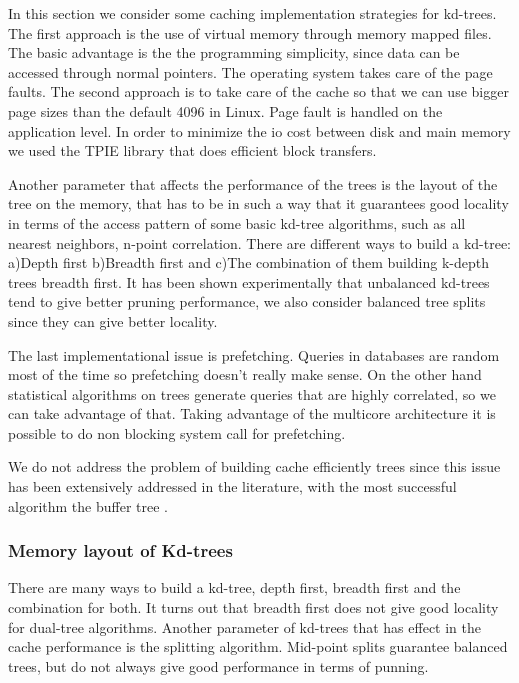 \documentclass[12pt,letterpaper,doublespaced,ETD,dvips,proposal]{gtthesis}
\begin{document}
\begin{Body}
In this section we consider some caching implementation strategies for
kd-trees. The first approach is the use of virtual memory through
memory mapped files. The basic advantage is the the programming
simplicity, since data can be accessed through normal pointers. The
operating system takes care of the page faults. The second approach
is to take care of the cache so that we can use bigger page sizes
than the default 4096 in Linux. Page fault is handled on the
application level. In order to minimize the io cost between disk and
main memory we used the TPIE library that does efficient block
transfers.

Another parameter that affects the performance of the trees is the
layout of the tree on the memory, that has to be in such a way that
it guarantees good locality in terms of the access pattern of some
basic kd-tree algorithms, such as all  nearest neighbors, n-point
correlation. There are different ways to build a kd-tree: a)Depth
first b)Breadth first and c)The combination of them building k-depth
trees breadth first. It has been shown experimentally that
unbalanced kd-trees tend to give better pruning performance, we also
consider balanced tree splits since they can give better locality.

The last implementational issue is prefetching.  Queries in
databases are random most of the time so prefetching doesn't really
make sense. On the other hand statistical algorithms on trees
generate queries that are highly correlated, so we can take
advantage of that. Taking advantage of the multicore architecture it
is possible to do non blocking system call for prefetching.

We do not address the problem of building cache
efficiently trees since this issue has been extensively addressed in
the literature, with the most successful algorithm the buffer tree
\cite{arge2003btt}.

\subsubsection{Memory layout of Kd-trees} There are many ways to
build a kd-tree, depth first, breadth first and the combination for
both. It turns out that breadth first does not give good locality
for dual-tree algorithms. Another parameter of
kd-trees that has effect in the cache performance is the splitting
algorithm. Mid-point splits  guarantee balanced trees, but do not
always give good performance in terms of punning.


\end{Body}
\end{document}
